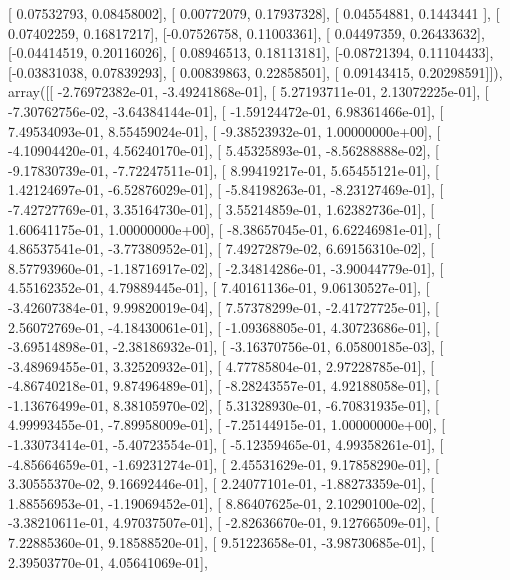 \documentclass{article}
\begin{document}
       [ 0.07532793,  0.08458002],
       [ 0.00772079,  0.17937328],
       [ 0.04554881,  0.1443441 ],
       [ 0.07402259,  0.16817217],
       [-0.07526758,  0.11003361],
       [ 0.04497359,  0.26433632],
       [-0.04414519,  0.20116026],
       [ 0.08946513,  0.18113181],
       [-0.08721394,  0.11104433],
       [-0.03831038,  0.07839293],
       [ 0.00839863,  0.22858501],
       [ 0.09143415,  0.20298591]]), array([[ -2.76972382e-01,  -3.49241868e-01],
       [  5.27193711e-01,   2.13072225e-01],
       [ -7.30762756e-02,  -3.64384144e-01],
       [ -1.59124472e-01,   6.98361466e-01],
       [  7.49534093e-01,   8.55459024e-01],
       [ -9.38523932e-01,   1.00000000e+00],
       [ -4.10904420e-01,   4.56240170e-01],
       [  5.45325893e-01,  -8.56288888e-02],
       [ -9.17830739e-01,  -7.72247511e-01],
       [  8.99419217e-01,   5.65455121e-01],
       [  1.42124697e-01,  -6.52876029e-01],
       [ -5.84198263e-01,  -8.23127469e-01],
       [ -7.42727769e-01,   3.35164730e-01],
       [  3.55214859e-01,   1.62382736e-01],
       [  1.60641175e-01,   1.00000000e+00],
       [ -8.38657045e-01,   6.62246981e-01],
       [  4.86537541e-01,  -3.77380952e-01],
       [  7.49272879e-02,   6.69156310e-02],
       [  8.57793960e-01,  -1.18716917e-02],
       [ -2.34814286e-01,  -3.90044779e-01],
       [  4.55162352e-01,   4.79889445e-01],
       [  7.40161136e-01,   9.06130527e-01],
       [ -3.42607384e-01,   9.99820019e-04],
       [  7.57378299e-01,  -2.41727725e-01],
       [  2.56072769e-01,  -4.18430061e-01],
       [ -1.09368805e-01,   4.30723686e-01],
       [ -3.69514898e-01,  -2.38186932e-01],
       [ -3.16370756e-01,   6.05800185e-03],
       [ -3.48969455e-01,   3.32520932e-01],
       [  4.77785804e-01,   2.97228785e-01],
       [ -4.86740218e-01,   9.87496489e-01],
       [ -8.28243557e-01,   4.92188058e-01],
       [ -1.13676499e-01,   8.38105970e-02],
       [  5.31328930e-01,  -6.70831935e-01],
       [  4.99993455e-01,  -7.89958009e-01],
       [ -7.25144915e-01,   1.00000000e+00],
       [ -1.33073414e-01,  -5.40723554e-01],
       [ -5.12359465e-01,   4.99358261e-01],
       [ -4.85664659e-01,  -1.69231274e-01],
       [  2.45531629e-01,   9.17858290e-01],
       [  3.30555370e-02,   9.16692446e-01],
       [  2.24077101e-01,  -1.88273359e-01],
       [  1.88556953e-01,  -1.19069452e-01],
       [  8.86407625e-01,   2.10290100e-02],
       [ -3.38210611e-01,   4.97037507e-01],
       [ -2.82636670e-01,   9.12766509e-01],
       [  7.22885360e-01,   9.18588520e-01],
       [  9.51223658e-01,  -3.98730685e-01],
       [  2.39503770e-01,   4.05641069e-01],
\end{document}

